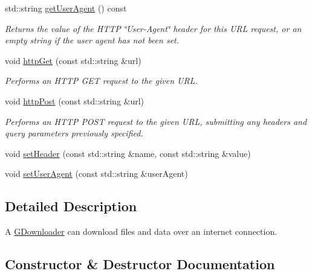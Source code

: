 \begin{DoxyCompactItemize}
std\+::string \mbox{\hyperlink{classGDownloader_a479f109234aad1c792be804bf6320c62}{get\+User\+Agent}} () const
\begin{DoxyCompactList}\small\item\em Returns the value of the H\+T\+TP \char`\"{}\+User-\/\+Agent\char`\"{} header for this U\+RL request, or an empty string if the user agent has not been set. \end{DoxyCompactList}\item 
void \mbox{\hyperlink{classGDownloader_a4bafb98a98bc6edc2403a3734c985618}{http\+Get}} (const std\+::string \&url)
\begin{DoxyCompactList}\small\item\em Performs an H\+T\+TP G\+ET request to the given U\+RL. \end{DoxyCompactList}\item 
void \mbox{\hyperlink{classGDownloader_a68ec0a089bf1b625b86753545e952a57}{http\+Post}} (const std\+::string \&url)
\begin{DoxyCompactList}\small\item\em Performs an H\+T\+TP P\+O\+ST request to the given U\+RL, submitting any headers and query parameters previously specified. \end{DoxyCompactList}\item 
void \mbox{\hyperlink{classGDownloader_af7065da3945b84ffb547b8bad9ddf8dc}{set\+Header}} (const std\+::string \&name, const std\+::string \&value)
\item 
void \mbox{\hyperlink{classGDownloader_a766286050e9b8fe08919f8353ecb4031}{set\+User\+Agent}} (const std\+::string \&user\+Agent)
\end{DoxyCompactItemize}


\subsection{Detailed Description}
A \mbox{\hyperlink{classGDownloader}{G\+Downloader}} can download files and data over an internet connection. 

\subsection{Constructor \& Destructor Documentation}
\mbox{\label{classGDownloader_a03a6336ad3aebf9d5904c50ce0cdc1dc}} 
